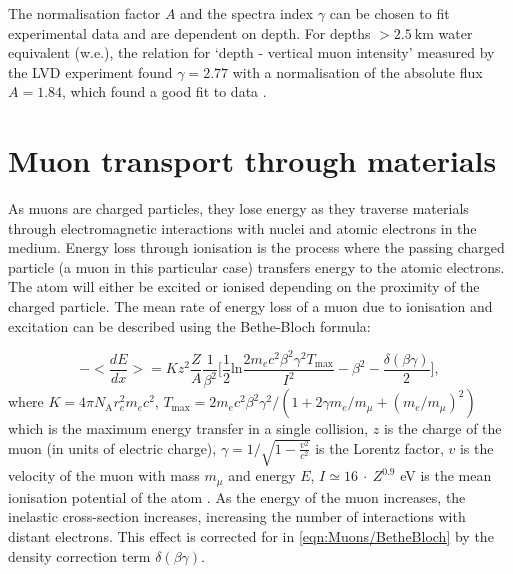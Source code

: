 The normalisation factor $A$ and the spectra index $\gamma$ can be chosen to fit experimental data and are dependent on depth. For depths $>2.5~\text{km}$ water equivalent (w.e.), the relation for `depth - vertical muon intensity' measured by the LVD experiment found $\gamma=2.77$ with a normalisation of the absolute flux $A=1.84$, which found a good fit to data \cite{LVD:1998lir}.

\section{Muon transport through materials}\label{sec:Muons/MuonTransport}
As muons are charged particles, they lose energy as they traverse materials through electromagnetic interactions with nuclei and atomic electrons in the medium. Energy loss through ionisation is the process where the passing charged particle (a muon in this particular case) transfers energy to the atomic electrons. The atom will either be excited or ionised depending on the proximity of the charged particle. The mean rate of energy loss of a muon due to ionisation and excitation can be described using the Bethe-Bloch formula:

\begin{equation}\label{eqn:Muons/BetheBloch}
    -\Biggl<\frac{dE}{dx}\Biggl>=Kz^2\frac{Z}{A}\frac{1}{\beta^2}\Biggl[ \frac{1}{2}\text{ln}\frac{2m_ec^2\beta^2\gamma^2T_{\text{max}}}{I^2}-\beta^2-\frac{\delta(\beta\gamma)}{2}\Biggl],
\end{equation}
where $K=4\pi N_\text{A}r_e^2m_ec^2$, $T_{\text{max}}=2m_ec^2\beta^2\gamma^2/(1+2\gamma m_e/m_\mu+(m_e/m_\mu)^2)$ which is the maximum energy transfer in a single collision, $z$ is the charge of the muon (in units of electric charge), $\gamma=1/\sqrt{1-\frac{v^2}{c^2}}$ is the Lorentz factor, $v$ is the velocity of the muon with mass $m_\mu$ and energy $E$, $I\simeq16\:\cdot\:Z^{0.9}$ eV is the mean ionisation potential of the atom \cite{GROOM2001183}. As the energy of the muon increases, the inelastic cross-section increases, increasing the number of interactions with distant electrons. This effect is corrected for in \autoref{eqn:Muons/BetheBloch} by the density correction term $\delta(\beta\gamma)$.

